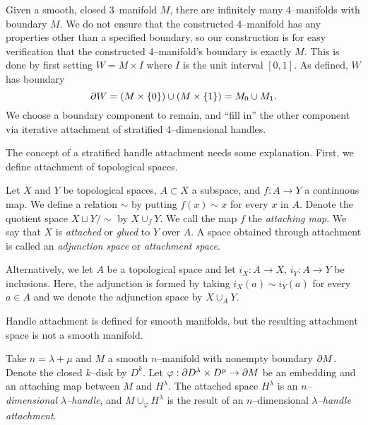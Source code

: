 \label{chapter:problem}



Given a smooth, closed 3--manifold $M$, there are infinitely many 4--manifolds with boundary $M$.
We do not ensure that the constructed 4--manifold has any properties other than a specified boundary, so our construction is for easy verification that the constructed 4--manifold's boundary is exactly $M$.
This is done by first setting $W=M\times I$ where $I$ is the unit interval $[0,1]$.
As defined, $W$ has boundary 
\[
	\partial W = (M\times\{0\}) \cup (M\times\{1\}) = M_0 \cup M_1.
\]
We choose a boundary component to remain, and ``fill in'' the other component via iterative attachment of stratified 4--dimensional handles.

The concept of a stratified handle attachment needs some explanation.
First, we define attachment of topological spaces.

\begin{defn}[Attachment]
	Let $X$ and $Y$ be topological spaces, $A\subset X$ a subspace, and $f:A\to Y$ a continuous map.
	We define a relation $\sim$ by putting $f(x)\sim x$ for every $x$ in $A$.
	Denote the quotient space $X\sqcup Y/\sim$ by $X\cup_f Y$.
	We call the map $f$ the \emph{attaching map}.  
	We say that $X$ is \emph{attached} or \emph{glued} to $Y$ over $A$.
	A space obtained through attachment is called an \emph{adjunction space} or \emph{attachment space}.
	
	Alternatively, we let $A$ be a topological space and let $i_X:A\to X$, $i_Y:A\to Y$ be inclusions.
	Here, the adjunction is formed by taking $i_X(a)\sim i_Y(a)$ for every $a\in A$ and we denote the adjunction space by $X\cup_A Y$.
\end{defn}

Handle attachment is defined for smooth manifolds, but the resulting attachment space is not a smooth manifold.

\begin{defn}[Handle]
	\label{def:handle}
	Take $n=\lambda+\mu$ and $M$ a smooth $n$--manifold with nonempty boundary $\partial M$.
	Denote the closed $k$--disk by $D^k$.
	Let $\varphi:\partial D^\lambda\times D^\mu\to\partial M$ be an embedding and an attaching map between $M$ and $H^\lambda$.
	The attached space $H^\lambda$ is an \emph{$n$--dimensional $\lambda$--handle}, and $M\cup_\varphi H^\lambda$ is the result of an $n$--dimensional \emph{$\lambda$--handle attachment}.
\end{defn}

